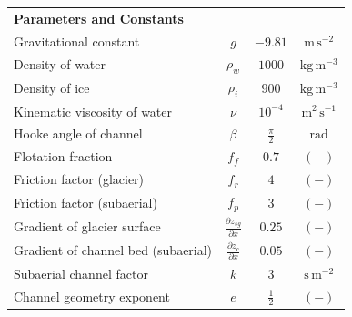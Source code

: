 \documentclass[11pt]{article}
\newcommand{\unit}[1]{$\mathrm{#1}$}
\begin{document}
\begin{spacing}{1}
\begin{table}[H]
\begin{tabular}{ l  c  c c }
      \textbf{Parameters and Constants}  & & &\\
      Gravitational constant&$g$& $-9.81$&$\mathrm{m\,s^{-2}}$\\
      Density of water & $\rho_w$& $1000$ & $\mathrm{kg\,m^{-3}}$ \\
      Density of ice & $\rho_i$& $900$ & $\mathrm{kg\,m^{-3}}$ \\
      Kinematic viscosity of water &$\nu$& $10^{-4}$& $\mathrm{m^2\,s^{-1}}$\\
      Hooke angle of channel & $\beta$ & $\frac{\pi}{2}$ & \unit{rad}\\
      Flotation fraction & $f_f$&$0.7$& $\mathrm{(-)}$\\
      Friction factor (glacier) & $f_r$ & $4$ & $\mathrm{(-)}$ \\
      Friction factor (subaerial) & $f_p$ & $3$ & $\mathrm{(-)}$\\
      Gradient of glacier surface & $\frac{\partial z_{sg}}{\partial x}$ &$0.25$& $\mathrm{(-)}$\\
      Gradient of channel bed (subaerial) &$\frac{\partial z_c}{\partial x}$ &$0.05$& $\mathrm{(-)}$\\
      Subaerial channel factor & $k$ &$3$ & $\mathrm{s\,m^{-2}}$\\
      Channel geometry exponent &$e$& $\frac{1}{2}$&$\mathrm{(-)}$ \\
      \hline
    \end{tabular}
    \label{table:vpm}
  \end{table}
  

\end{spacing}
\end{document}
